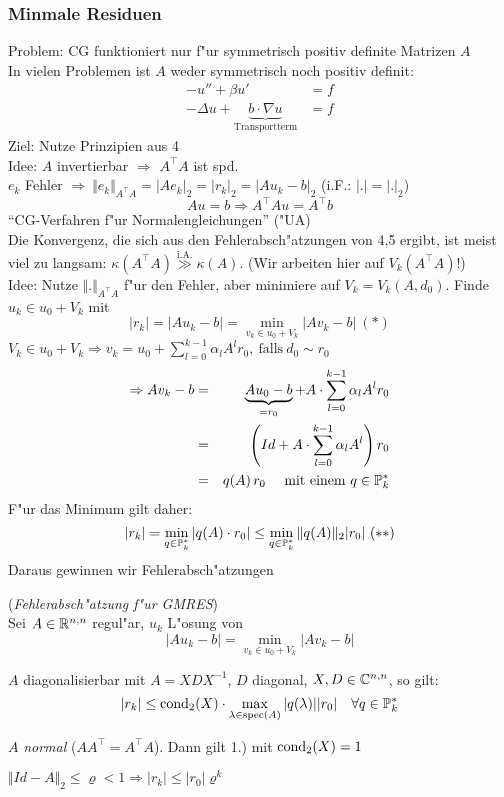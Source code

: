 \documentclass{scrartcl}
\begin{document}
\subsubsection{Minmale Residuen}
Problem: CG funktioniert nur f"ur symmetrisch positiv definite Matrizen $A$ \\
In vielen Problemen ist $A$ weder symmetrisch noch positiv definit:
\begin{align}
-u'' + \beta u' & =f \tag{in $\RR$} \\
- \Delta u + \underbrace{b \cdot \nabla u}_\mathrm{Transportterm} & =f \tag{im $\RR^d$}
\end{align}
Ziel: Nutze Prinzipien aus 4 \\
Idee: $A$ invertierbar $\Rightarrow$ $A^\top A$ ist spd. \\
$e_k$ Fehler $\Rightarrow \ \Vert e_k \Vert_{A^\top A} = \vert A e_k \vert_2 = \vert r_k \vert_2 = \vert A u_k - b \vert_2$ (i.F.: $\vert. \vert = \vert . \vert_2$) 
$$Au = b \Rightarrow A^\top A u = A^\top b$$
"`CG-Verfahren f"ur Normalengleichungen"' ("UA) \\
Die Konvergenz, die sich aus den Fehlerabsch"atzungen von 4,5 ergibt, ist meist viel zu langsam: $\kappa(A^\top A) \stackrel{\mathrm{i.A.}}{\gg} \kappa(A)$. (Wir arbeiten hier auf $V_k(A^\top A)$!) \\
Idee: Nutze $\Vert. \Vert _{A^\top A}$ f"ur den Fehler, aber minimiere auf $V_k = V_k(A, d_0)$. Finde $u_k \in u_0 + V_k$ mit $$\vert r_k \vert = \vert A u_k - b \vert = \min\limits_{v_k \in u_0 + V_k} \vert Av_k - b \vert \ (*)$$
$V_k \in u_0 + V_k \Rightarrow v_k = u_0 + \sum\limits_{l=0}^{k-1} \alpha_l A^l r_0, \mathrm{\ falls \ } d_0 \sim r_0$ \\
\begin{eqnarray*}
\Rightarrow Av_k - b & = & \underbrace{A u_0 - b }_{=r_0} + A \cdot \sum\limits_{l=0}^{k-1} \alpha_l A^l r_0 \\
& = & \left( Id + A \cdot \sum\limits_{l=0}^{k-1} \alpha_l A^l \right)r_0 \\
& = & q(A) \, r_0 \quad \mathrm{\ mit \ einem \ } q \in \mathbb{P}_k^*
\end{eqnarray*}
F"ur das Minimum gilt daher:
$$ \vert r_k \vert = \min\limits_{q \in \mathbb{P}_k^*} \vert q(A) \cdot r_0 \vert \leq \min\limits_{q \in \mathbb{P}_k^*} \Vert q(A) \Vert_2 \vert r_0 \vert \ (**)$$
Daraus gewinnen wir Fehlerabsch"atzungen
\begin{Satz} (\emph{Fehlerabsch"atzung f"ur GMRES}) \\
Sei $A \in \mathbb{R}^{n,n}$ regul"ar, $u_k$ L"osung von 
$$\vert A u_k - b \vert = \min\limits_{v_k \in u_0 + V_k} \vert A v_k - b \vert$$
\begin{1aufz}
\item $A$ diagonalisierbar mit $A = XDX^{-1}$, $D$ diagonal, $X,D \in \mathbb{C}^{n,n}$, so gilt:
$$\vert r_k \vert \leq \mathrm{cond}_2 (X) \cdot \max\limits_{\lambda \in \mathrm{spec}(A)} \vert q(\lambda) \vert \vert r_0 \vert \quad \forall q \in \mathbb{P}_k^*$$
\item $A$ \emph{normal} ($AA^\top = A^\top A$). Dann gilt 1.) mit $\mathrm{cond}_2(X) = 1$
\item $\Vert Id - A \Vert_2 \leq \varrho < 1 \Rightarrow \vert r_k \vert \leq \vert r_0 \vert \varrho^k$
\end{1aufz}
\end{Satz}
\end{document}
